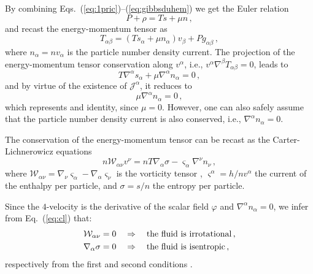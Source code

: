 \documentclass[twocolumn,showpacs, nofootinbib,aps,superscriptaddress, eqsecnum,prd,prl,notitlepage,showkeys,10pt,reprint]{revtex4-1}
\begin{document}
By combining Eqs.~(\ref{eq:1pric})--(\ref{eq:gibbsduhem}) we get the Euler relation
%
 \begin{equation}
\label{eq:euler}
P+\rho = Ts + \mu n\,,
\end{equation}
%
and recast the energy-momentum tensor as
%
\begin{equation}
\label{eq:tnesenimp2}
T_{\alpha\beta}=\left(Ts_\alpha +\mu n_\alpha\right)v_\beta + P g_{\alpha\beta}\,,
\end{equation}
%
where $n_\alpha=nv_\alpha$ is the particle number density current.
The projection of the energy-momentum tensor conservation along $v^\alpha$, i.e., $v^\alpha\nabla^\beta T_{\alpha\beta}=0$, leads to
%
\begin{equation}
\label{eq:tnesenimp3}
T\nabla^\alpha s_\alpha + \mu \nabla^\alpha n_\alpha = 0\,,
\end{equation}
%
and by virtue of the existence of $\mathcal{J}^\alpha$, it reduces to
%
\begin{equation}
\label{eq:tnesenimp4}
\mu \nabla^\alpha n_\alpha = 0\,,
\end{equation}
%
which represents and identity, since $\mu=0$.
However, one can also safely assume that the particle number density current is also conserved, i.e., $\nabla^\alpha n_\alpha = 0$.

The conservation of the energy-momentum tensor can be recast as the Carter-Lichnerowicz equations \cite{2016PhRvD..94b5034B}
%
\begin{equation}
\label{eq:cl}
n\mathcal{W}_{\alpha\nu}v^\nu=nT\nabla_\alpha\sigma-\varsigma_\alpha\nabla^\nu n_\nu\,,
\end{equation}
%
where $\mathcal{W}_{\alpha\nu}=\nabla_\nu \varsigma_\alpha -\nabla_\alpha \varsigma_\nu$ is the vorticity tensor \cite{2013rehy.book.....R}, $\varsigma^\alpha=h/nv^\alpha$ the current of the enthalpy per particle, and $\sigma=s/n$ the entropy per particle.

\noindent Since the $4$-velocity is the derivative of the scalar field $\varphi$ and  $\nabla^\alpha n_\alpha = 0$, we infer from Eq.~(\ref{eq:cl}) that:
\begin{align}
\mathcal{W}_{\alpha\nu}=0\quad&\Rightarrow\quad{\rm the\ fluid\ is\ irrotational}\,,\\
\nabla_\alpha\sigma=0\quad&\Rightarrow\quad{\rm the\ fluid\ is\ isentropic}\,,
\end{align}
respectively from the first and second conditions \cite{2016PhRvD..94b5034B}.


\end{document}
